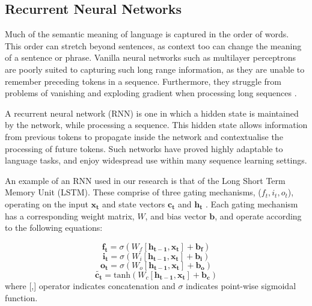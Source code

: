 \subsection{Recurrent Neural Networks} %
\label{sub:recurrent_neural_networks}

Much of the semantic meaning of language is captured in the order of words. 
This order can stretch beyond sentences, as context too can change the meaning of a sentence or phrase.
Vanilla neural networks such as multilayer perceptrons are poorly suited to capturing such long range information, as they are unable to remember preceding tokens in a sequence. 
Furthermore, they struggle from problems of vanishing and exploding gradient when processing long sequences \cite{bengio_learning_1994}.

A recurrent neural network (RNN) is one in which a hidden state is maintained by the network, while processing a sequence.
This hidden state allows information from previous tokens to propagate inside the network and contextualise the processing of future tokens.
Such networks have proved highly adaptable to language tasks, and enjoy widespread use within many sequence learning settings\cite{lipton_critical_2015}.

An example of an RNN used in our research is that of the Long Short Term Memory Unit (LSTM)\cite{hochreiter_long_1997}. These comprise of three gating mechanisms, ($f_t, i_t, o_t$), operating on the input $\mathbf{x_t}$ and state vectors $\mathbf{c_t}$ and $\mathbf{h_t}$
\cite{noauthor_understanding_nodate}. Each gating mechanism has a corresponding weight matrix, $W$, and bias vector $\mathbf{b}$, and operate according to the following equations:

\begin{equation}
    \mathbf{f_t} = \sigma(W_f [\mathbf{h_{t-1}}, \mathbf{x_t}] + \mathbf{b_f})
    \label{eq:lstm1}
\end{equation}
\begin{equation}
    \mathbf{i_t} = \sigma(W_i [\mathbf{h_{t-1}}, \mathbf{x_t}] + \mathbf{b_i})
    \label{eq:lstm2}
\end{equation}
\begin{equation}
    \mathbf{o_t} = \sigma(W_o [\mathbf{h_{t-1}}, \mathbf{x_t}] + \mathbf{b_o})
    \label{eq:lstm3}
\end{equation}
\begin{equation}
    \mathbf{\tilde{c_t}} = \text{tanh}(W_c [\mathbf{h_{t-1}}, \mathbf{x_t}] + \mathbf{b_c})
    \label{eq:lstm4}
\end{equation}
where [,] operator indicates concatenation and $\sigma$ indicates point-wise sigmoidal function.

